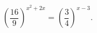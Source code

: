 \begin{ex}[type=equation]
	\begin{condition}
		$\left(\dfrac{16}{9}\right)^{x^2 + 2x}=\left(\dfrac{3}{4}\right)^{x - 3} .$
	\end{condition}
\end{ex}